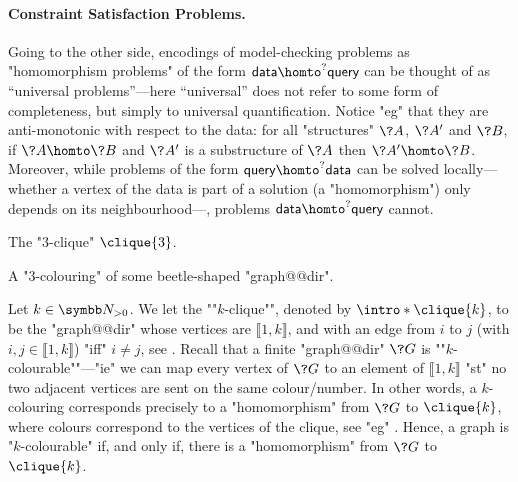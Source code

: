 \paragraph*{Constraint Satisfaction Problems.}
Going to the other side, encodings of model-checking problems
as "homomorphism problems" of the form $\textsf{data} \homto^? \textsf{query}$
can be thought of as ``universal problems''---here ``universal'' does not
refer to some form of completeness, but simply to universal quantification.
Notice "eg" that they are anti-monotonic with respect to the data:
for all "structures" $\?A$, $\?A'$ and $\?B$, if $\?A \homto \?B$ and $\?A'$ is a substructure
of $\?A$ then $\?A' \homto \?B$.
Moreover, while problems of the form $\textsf{query} \homto^? \textsf{data}$
can be solved locally---whether a vertex of the data is part of a solution (a "homomorphism") only 
depends on its neighbourhood---, problems $\textsf{data} \homto^? \textsf{query}$ cannot.

\begin{marginfigure}[-13em]
	\centering
	\begin{tikzpicture}
		
	\end{tikzpicture}
	\caption{
		\AP\label{fig:intro-3-clique}
		The "$3$-clique" $\clique{3}$.
	}
\end{marginfigure}
\begin{marginfigure}
	\centering
	\begin{tikzpicture}
		
	\end{tikzpicture}
	\caption{
		\AP\label{fig:dichotomy-ex-3-clique}
		A "$3$-colouring" of some beetle-shaped "graph@@dir".
	}
\end{marginfigure}
\begin{example}
	\AP\label{ex:graph-colouring-as-hom}
	Let $k\in\Np$. We let the \AP""$k$-clique"", denoted by $\intro*\clique{k}$,
	to be the "graph@@dir" whose vertices are $\lBrack 1,k\rBrack$,
	and with an edge from $i$ to $j$ (with $i,j \in \lBrack 1,k\rBrack$)
	"iff" $i\neq j$, see .
	Recall that a finite "graph@@dir" $\?G$ is \AP""$k$-colourable""---"ie"
	we can map every vertex of $\?G$ to an element of $\lBrack 1,k\rBrack$
	"st" no two adjacent vertices are sent on the same colour/number.
	In other words, a $k$-colouring corresponds precisely to a "homomorphism" from $\?G$
	to $\clique{k}$, where colours correspond to the vertices of the clique,
	see "eg" .
	Hence, a graph is "$k$-colourable" if, and only if,
	there is a "homomorphism" from $\?G$ to $\clique{k}$.
\end{example}

